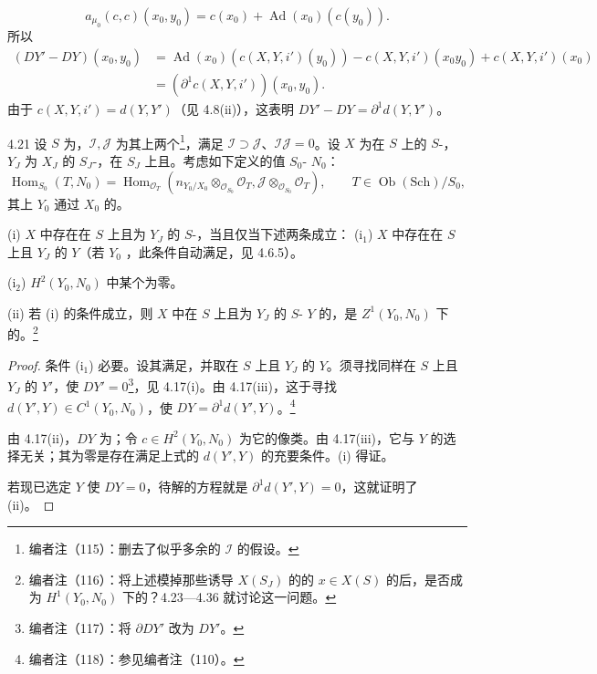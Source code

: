 \[a_{\mu_0}(c,c)(x_0,y_0)=c(x_0)+\operatorname{Ad}(x_0)(c(y_0)).\tag{4}\]
所以
\[
\begin{aligned}
(DY'-DY)(x_0,y_0)&=\operatorname{Ad}(x_0)(c(X,Y,i')(y_0))-c(X,Y,i')(x_0y_0)+c(X,Y,i')(x_0)\\
&=(\partial^1c(X,Y,i'))(x_0,y_0).
\end{aligned}
\]
由于 $c(X,Y,i')=d(Y,Y')$（见 4.8(ii)），这表明 $DY'-DY=\partial^1d(Y,Y')$。
\begin{SGAresult}{}{4.21}
设 $S$ 为，$\mathscr I,\mathscr J$ 为其上两个\footnote{编者注（115）：删去了似乎多余的 $\mathscr I$ 的假设。}，满足 $\mathscr I\supset\mathscr J$、$\mathscr I\mathscr J=0$。设 $X$ 为在 $S$ 上的 $S$-，$Y_J$ 为 $X_J$ 的 $S_J$-，在 $S_J$ 上且。考虑如下定义的值 $S_0$- $N_0$：
\[\operatorname{Hom}_{S_0}(T,N_0)=\operatorname{Hom}_{\mathscr O_T}(n_{Y_0/X_0}\otimes_{\mathscr O_{S_0}}\mathscr O_T,\mathscr J\otimes_{\mathscr O_{S_0}}\mathscr O_T),\qquad T\in\operatorname{Ob}(\mathrm{Sch})/S_0,\]
其上 $Y_0$ 通过 $X_0$ 的。

(i) $X$ 中存在在 $S$ 上且为 $Y_J$ 的 $S$-，当且仅当下述两条成立：
(i$_1$) $X$ 中存在在 $S$ 上且 $Y_J$ 的 $Y$（若 $Y_0$ ，此条件自动满足，见 4.6.5）。

(i$_2$) $H^2(Y_0,N_0)$ 中某个为零。

(ii) 若 (i) 的条件成立，则 $X$ 中在 $S$ 上且为 $Y_J$ 的 $S$- $Y$ 的，是 $Z^1(Y_0,N_0)$ 下的。\footnote{编者注（116）：将上述模掉那些诱导 $X(S_J)$ 的的 $x\in X(S)$ 的后，是否成为 $H^1(Y_0,N_0)$ 下的？4.23—4.36 就讨论这一问题。}
\end{SGAresult}
\begin{proof}
条件 (i$_1$) 必要。设其满足，并取在 $S$ 上且 $Y_J$ 的 $Y$。须寻找同样在 $S$ 上且 $Y_J$ 的 $Y'$，使 $DY'=0$\footnote{编者注（117）：将 $\partial DY'$ 改为 $DY'$。}，见 4.17(i)。由 4.17(iii)，这于寻找 $d(Y',Y)\in C^1(Y_0,N_0)$，使 $DY=\partial^1d(Y',Y)$。\footnote{编者注（118）：参见编者注（110）。}

由 4.17(ii)，$DY$ 为；令 $c\in H^2(Y_0,N_0)$ 为它的像类。由 4.17(iii)，它与 $Y$ 的选择无关；其为零是存在满足上式的 $d(Y',Y)$ 的充要条件。(i) 得证。

若现已选定 $Y$ 使 $DY=0$，待解的方程就是 $\partial^1d(Y',Y)=0$，这就证明了 (ii)。
\end{proof}
